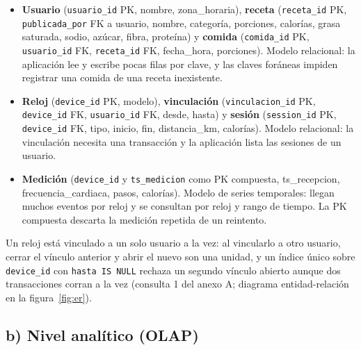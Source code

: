 \documentclass[11pt]{article}
\begin{document}
\begin{itemize}
  \item \textbf{Usuario} (\texttt{usuario\_id} PK, nombre, zona\_horaria),
  \textbf{receta} (\texttt{receta\_id} PK, \texttt{publicada\_por} FK a usuario,
  nombre, categoría, porciones, calorías, grasa saturada, sodio, azúcar, fibra,
  proteína) y \textbf{comida} (\texttt{comida\_id} PK, \texttt{usuario\_id} FK,
  \texttt{receta\_id} FK, fecha\_hora, porciones). Modelo relacional: la
  aplicación lee y escribe pocas filas por clave, y las claves foráneas impiden
  registrar una comida de una receta inexistente.
  \item \textbf{Reloj} (\texttt{device\_id} PK, modelo), \textbf{vinculación}
  (\texttt{vinculacion\_id} PK, \texttt{device\_id} FK, \texttt{usuario\_id} FK,
  desde, hasta) y \textbf{sesión} (\texttt{session\_id} PK, \texttt{device\_id}
  FK, tipo, inicio, fin, distancia\_km, calorías). Modelo relacional: la
  vinculación necesita una transacción y la aplicación lista las sesiones de un
  usuario.
  \item \textbf{Medición} (\texttt{device\_id} y \texttt{ts\_medicion} como PK
  compuesta, ts\_recepcion, frecuencia\_cardiaca, pasos, calorías). Modelo de
  series temporales: llegan muchos eventos por reloj y se consultan por reloj y
  rango de tiempo. La PK compuesta descarta la medición repetida de un
  reintento.
\end{itemize}

 Un reloj está
vinculado a un solo usuario a la vez: al vincularlo a otro usuario, cerrar el vínculo anterior y abrir el nuevo son una unidad, y un índice único
sobre \texttt{device\_id} con \texttt{hasta IS NULL} rechaza un segundo vínculo
abierto aunque dos transacciones corran a la vez (consulta 1 del anexo A;
diagrama entidad-relación en la figura~\ref{fig:er}).

\subsection{b) Nivel analítico (OLAP)}
\end{document}
